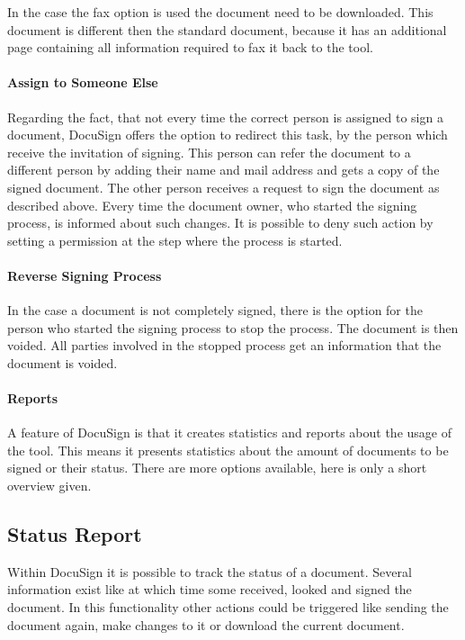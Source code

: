 In the case the fax option is used the document need to be downloaded. This document is different then the standard document, because it has an additional page containing all information required to fax it back to the tool. 

\paragraph{Assign to Someone Else}
Regarding the fact, that not every time the correct person is assigned to sign a document, DocuSign offers the option to redirect this task, by the person which receive the invitation of signing. This person can refer the document to a different person by adding their name and mail address and gets a copy of the signed document. The other person receives a request to sign the document as described above. Every time the document owner, who started the signing process, is informed about such changes.
It is possible to deny such action by setting a permission at the step where the process is started. 

\paragraph{Reverse Signing Process}
In the case a document is not completely signed, there is the option for the person who started the signing process to stop the process. The document is then voided. All parties involved in the stopped process get an information that the document is voided.

\paragraph{Reports}
A feature of DocuSign is that it creates statistics and reports about the usage of the tool. This means it presents statistics about the amount of documents to be signed or their status. There are more options available, here is only a short overview given.

\subsection{Status Report}
Within DocuSign it is possible to track the status of a document. Several information exist like at which time some received, looked and signed the document. In this functionality other actions could be triggered like sending the document again, make changes to it or download the current document.

